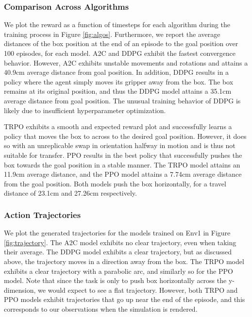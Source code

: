 \documentclass[conference]{IEEEtran}
\begin{document}
\vspace{2mm}
\subsubsection{Comparison Across Algorithms}
We plot the reward as a function of timesteps for each algorithm during the training process in Figure \ref{fig:algos}. Furthermore, we report the average distances of the box position at the end of an episode to the goal position over 100 episodes, for each model. A2C and DDPG exhibit the fastest convergence behavior. However, A2C exhibits unstable movements and rotations and attains a 40.9cm average distance from goal position. In addition, DDPG results in a policy where the agent simply moves its gripper away from the box. The box remains at its original position, and thus the DDPG model attains a 35.1cm average distance from goal position. The unusual training behavior of DDPG is likely due to insufficient hyperparameter optimization. 

TRPO exhibits a smooth and expected reward plot and successfully learns a policy that moves the box to across to the desired goal position. However, it does so with an unreplicable swap in orientation halfway in motion and is thus not suitable for transfer. PPO results in the best policy that successfully pushes the box towards the goal position in a stable manner. The TRPO model attains an 11.9cm average distance, and the PPO model attains a 7.74cm average distance from the goal position. Both models push the box horizontally, for a travel distance of 23.1cm and 27.26cm respectively.

\vspace{2mm}
\subsubsection{Action Trajectories}
We plot the generated trajectories for the models trained on Env1 in Figure \ref{fig:trajectory}. The A2C model exhibits no clear trajectory, even when taking their average. The DDPG model exhibits a clear trajectory, but as discussed above, the trajectory moves in a direction away from the box. The TRPO model exhibits a clear trajectory with a parabolic arc, and similarly so for the PPO model. Note that since the task is only to push box horizontally across the y-dimension, we would expect to see a flat trajectory. However, both TRPO and PPO models exhibit trajectories that go up near the end of the episode, and this corresponds to our observations when the simulation is rendered.
\end{document}
